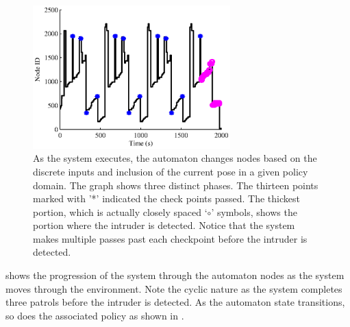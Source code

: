 \begin{figure}[bt]
  \centering 

    \includegraphics[width=3in]{graphics/AutRnd5_Sim8_nodes.eps}

    \caption[`LAGR' timid night watch automaton node switching.]{As the system
      executes, the automaton changes nodes based on the discrete inputs and
      inclusion of the current pose in a given policy domain.  The graph shows three
      distinct phases.  The thirteen points marked with '*' indicated the check
      points passed.  The thickest portion, which is actually closely spaced
      `$\circ$' symbols, shows the portion where the intruder is detected.  Notice
      that the system makes multiple passes past each checkpoint before the intruder
      is detected.}
   \label{fig:lagr_Aautomaton_full_nodes}
\end{figure}


 shows the progression of the system through the
automaton nodes as the system moves through the environment.  Note the cyclic nature
as the system completes three patrols before the intruder is detected.  As the
automaton state transitions, so does the associated policy as shown in
.

